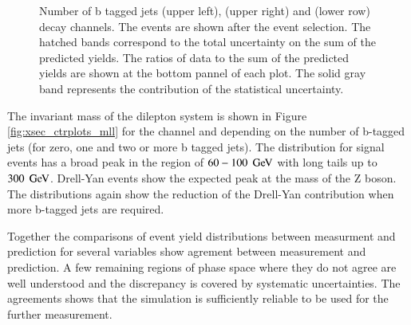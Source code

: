 \begin{figure}[htbp!]
\begin{center}
    \caption{Number of b tagged jets \emu (upper left), \mumu (upper right) and \ee (lower row) decay channels.
        The events are shown after the
        event selection.  The hatched
        bands correspond to the total uncertainty on the sum of the
        predicted yields. 
        The ratios of data to the sum of the predicted yields are
        shown at the bottom pannel of each plot. The solid gray band
        represents the contribution of the statistical uncertainty.}  
       \label{fig:xsec_bjets_ctrplots}
  \end{center}
\end{figure}


The invariant mass of the dilepton system is shown in Figure \ref{fig:xsec_ctrplots_mll} for the \emu channel and depending on the number of b-tagged jets (for zero, one and two or more b tagged jets).
The distribution for signal events has a broad peak in the region of $60-100 \; \,\text{Ge\hspace{-.08em}V}$ with long tails up to $300 \; \,\text{Ge\hspace{-.08em}V}$.
Drell-Yan events show the expected peak at the mass of the Z boson.
The distributions again show the reduction of the  Drell-Yan contribution when more b-tagged jets are required.

Together the comparisons of event yield distributions between measurment and prediction for several variables show agrement between measurement and prediction.
A few remaining regions of phase space where they do not agree are well understood and the discrepancy is covered by systematic uncertainties.
The agreements shows that the simulation is sufficiently reliable to be used for the further measurement.


